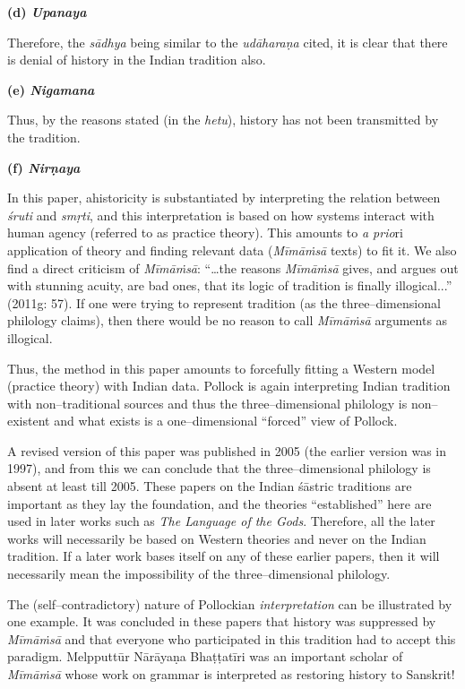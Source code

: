 \textbf{(d) \textit{Upanaya}}

Therefore, the \textit{sādhya} being similar to the \textit{udāharaṇa} cited, it is clear that there is denial of history in the Indian tradition also.

\textbf{(e) \textit{Nigamana}}

Thus, by the reasons stated (in the \textit{hetu}), history has not been transmitted by the tradition.

\textbf{(f) \textit{Nirṇaya}}

In this paper, ahistoricity is substantiated by interpreting the relation between \textit{śruti} and \textit{smṛti}, and this interpretation is based on how systems interact with human agency (referred to as practice theory). This amounts to \textit{a prio}ri application of theory and finding relevant data (\textit{Mīmāṁsā} texts) to fit it. We also find a direct criticism of \textit{Mīmāṁsā}: “…the reasons \textit{Mīmāṁsā} gives, and argues out with stunning acuity, are bad ones, that its logic of tradition is finally illogical...” (2011g: 57). If one were trying to represent tradition (as the three–dimensional philology claims), then there would be no reason to call \textit{Mīmāṁsā} arguments as illogical.

Thus, the method in this paper amounts to forcefully fitting a Western model (practice theory) with Indian data. Pollock is again interpreting Indian tradition with non–traditional sources and thus the three–dimensional philology is non–existent and what exists is a one–dimensional “forced” view of Pollock.

A revised version of this paper was published in 2005 (the earlier version was in 1997), and from this we can conclude that the three–dimensional philology is absent at least till 2005. These papers on the Indian śāstric traditions are important as they lay the foundation, and the theories “established” here are used in later works such as \textit{The Language of the Gods}. Therefore, all the later works will necessarily be based on Western theories and never on the Indian tradition. If a later work bases itself on any of these earlier papers, then it will necessarily mean the impossibility of the three–dimensional philology.

The (self–contradictory) nature of Pollockian \textit{interpretation} can be illustrated by one example. It was concluded in these papers that history was suppressed by \textit{Mīmāṁsā} and that everyone who participated in this tradition had to accept this paradigm. Melpputtūr Nārāyaṇa Bhaṭṭatīri was an important scholar of \textit{Mīmāṁsā} whose work on grammar is interpreted as restoring history to Sanskrit!

